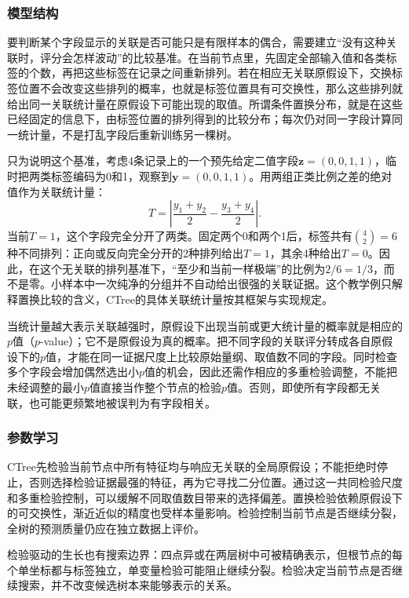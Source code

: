 \subsubsection{模型结构}
要判断某个字段显示的关联是否可能只是有限样本的偶合，需要建立“没有这种关联时，评分会怎样波动”的比较基准。在当前节点里，先固定全部输入值和各类标签的个数，再把这些标签在记录之间重新排列。若在相应无关联原假设下，交换标签位置不会改变这些排列的概率，也就是标签位置具有可交换性，那么这些排列就给出同一关联统计量在原假设下可能出现的取值。所谓条件置换分布，就是在这些已经固定的信息下，由标签位置的排列得到的比较分布；每次仍对同一字段计算同一统计量，不是打乱字段后重新训练另一棵树。

只为说明这个基准，考虑4条记录上的一个预先给定二值字段$\bm z=(0,0,1,1)$，临时把两类标签编码为0和1，观察到$\bm y=(0,0,1,1)$。用两组正类比例之差的绝对值作为关联统计量：
\[
  T=\left|\frac{y_1+y_2}{2}-\frac{y_3+y_4}{2}\right|.
\]
当前$T=1$，这个字段完全分开了两类。固定两个0和两个1后，标签共有$\binom42=6$种不同排列：正向或反向完全分开的2种排列给出$T=1$，其余4种给出$T=0$。因此，在这个无关联的排列基准下，“至少和当前一样极端”的比例为$2/6=1/3$，而不是零。小样本中一次纯净的分组并不自动给出很强的关联证据。这个教学例只解释置换比较的含义，CTree的具体关联统计量按其框架与实现规定。

当统计量越大表示关联越强时，原假设下出现当前或更大统计量的概率就是相应的$p$值（$p$-value）；它不是原假设为真的概率。把不同字段的关联评分转成各自原假设下的$p$值，才能在同一证据尺度上比较原始量纲、取值数不同的字段。同时检查多个字段会增加偶然选出小$p$值的机会，因此还需作相应的多重检验调整，不能把未经调整的最小$p$值直接当作整个节点的检验$p$值。否则，即使所有字段都无关联，也可能更频繁地被误判为有字段相关。

\subsubsection{参数学习}
CTree先检验当前节点中所有特征均与响应无关联的全局原假设；不能拒绝时停止，否则选择检验证据最强的特征，再为它寻找二分位置。通过这一共同检验尺度和多重检验控制，可以缓解不同取值数目带来的选择偏差。置换检验依赖原假设下的可交换性，渐近近似的精度也受样本量影响。检验控制当前节点是否继续分裂，全树的预测质量仍应在独立数据上评价。

检验驱动的生长也有搜索边界：四点异或在两层树中可被精确表示，但根节点的每个单坐标都与标签独立，单变量检验可能阻止继续分裂。检验决定当前节点是否继续搜索，并不改变候选树本来能够表示的关系。

